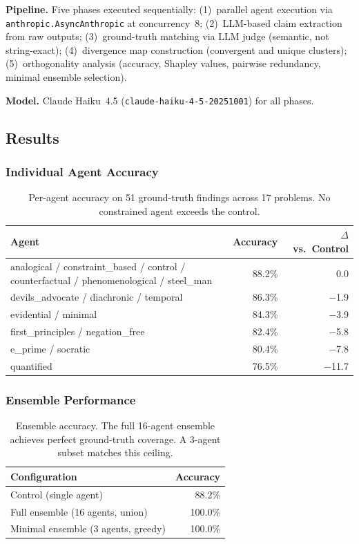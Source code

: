 \documentclass[11pt,a4paper]{article}
\begin{document}
\textbf{Pipeline.} Five phases executed sequentially: (1)~parallel agent execution via \texttt{anthropic.AsyncAnthropic} at concurrency~8; (2)~LLM-based claim extraction from raw outputs; (3)~ground-truth matching via LLM judge (semantic, not string-exact); (4)~divergence map construction (convergent and unique clusters); (5)~orthogonality analysis (accuracy, Shapley values, pairwise redundancy, minimal ensemble selection).

\textbf{Model.} Claude Haiku~4.5 (\texttt{claude-haiku-4-5-20251001}) for all phases.

\subsection{Results}

\subsubsection{Individual Agent Accuracy}

\begin{table}[t]
\centering
\caption{Per-agent accuracy on 51 ground-truth findings across 17 problems. No constrained agent exceeds the control.}
\label{tab:agent-accuracy}
\smallskip
\begin{tabular}{@{}lrr@{}}
\toprule
Agent & Accuracy & $\Delta$ vs.\ Control \\
\midrule
analogical / constraint\_based / control / counterfactual / phenomenological / steel\_man & 88.2\% & 0.0 \\
devils\_advocate / diachronic / temporal & 86.3\% & $-$1.9 \\
evidential / minimal & 84.3\% & $-$3.9 \\
first\_principles / negation\_free & 82.4\% & $-$5.8 \\
e\_prime / socratic & 80.4\% & $-$7.8 \\
quantified & 76.5\% & $-$11.7 \\
\bottomrule
\end{tabular}
\end{table}

\subsubsection{Ensemble Performance}

\begin{table}[H]
\centering
\caption{Ensemble accuracy. The full 16-agent ensemble achieves perfect ground-truth coverage. A 3-agent subset matches this ceiling.}
\label{tab:ensemble}
\smallskip
\begin{tabular}{@{}lr@{}}
\toprule
Configuration & Accuracy \\
\midrule
Control (single agent) & 88.2\% \\
Full ensemble (16 agents, union) & 100.0\% \\
Minimal ensemble (3 agents, greedy) & 100.0\% \\
\bottomrule
\end{tabular}
\end{table}
\end{document}
